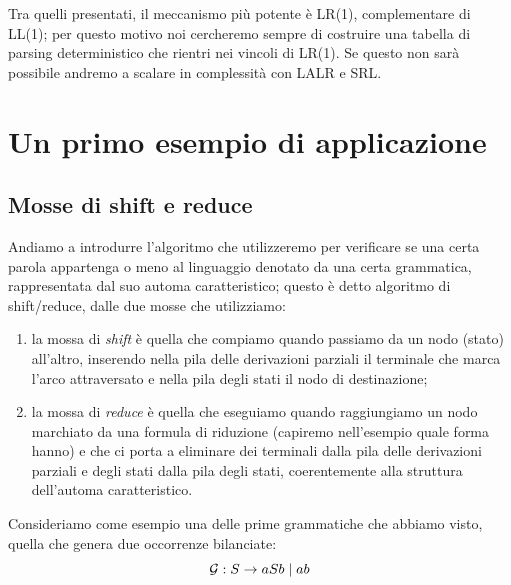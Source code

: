 \documentclass[class=book, crop=false, oneside, 12pt]{standalone}
\begin{document}
Tra quelli presentati, il meccanismo più potente è LR(1), complementare di LL(1); per questo motivo noi cercheremo sempre di costruire una tabella di parsing deterministico che rientri nei vincoli di LR(1). Se questo non sarà possibile andremo a scalare in complessità con LALR e SRL.

\section{Un primo esempio di applicazione}
\subsection{Mosse di shift e reduce}
Andiamo a introdurre l'algoritmo che utilizzeremo per verificare se una certa parola appartenga o meno al linguaggio denotato da una certa grammatica, rappresentata dal suo automa caratteristico; questo è detto algoritmo di shift/reduce, dalle due mosse che utilizziamo:
\begin{enumerate}
    \item la mossa di \emph{shift} è quella che compiamo quando passiamo da un nodo (stato) all'altro, inserendo nella pila delle derivazioni parziali il terminale che marca l'arco attraversato e nella pila degli stati il nodo di destinazione;
    \item la mossa di \emph{reduce} è quella che eseguiamo quando raggiungiamo un nodo marchiato da una formula di riduzione (capiremo nell'esempio quale forma hanno) e che ci porta a eliminare dei terminali dalla pila delle derivazioni parziali e degli stati dalla pila degli stati, coerentemente alla struttura dell'automa caratteristico.
\end{enumerate}
Consideriamo come esempio una delle prime grammatiche che abbiamo visto, quella che genera due occorrenze bilanciate:
\begin{equation}
    \label{balanced}
    \mathcal{G}: S \to aSb \mid ab
\end{equation}
\end{document}
